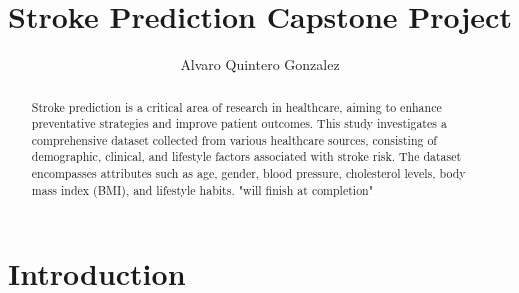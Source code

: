 \documentclass[runningheads]{llncs}
\begin{document}
%
\title{Stroke Prediction Capstone Project}
%
%
\author{Alvaro Quintero Gonzalez}
%
%
%
\maketitle              %
%
\begin{abstract}
Stroke prediction is a critical area of research in healthcare, aiming to enhance preventative strategies and improve patient outcomes. This study investigates a comprehensive dataset collected from various healthcare sources, consisting of demographic, clinical, and lifestyle factors associated with stroke risk. The dataset encompasses attributes such as age, gender, blood pressure, cholesterol levels, body mass index (BMI), and lifestyle habits. "will finish at completion"

\end{abstract}
%
%
%
\section{Introduction}
\end{document}

